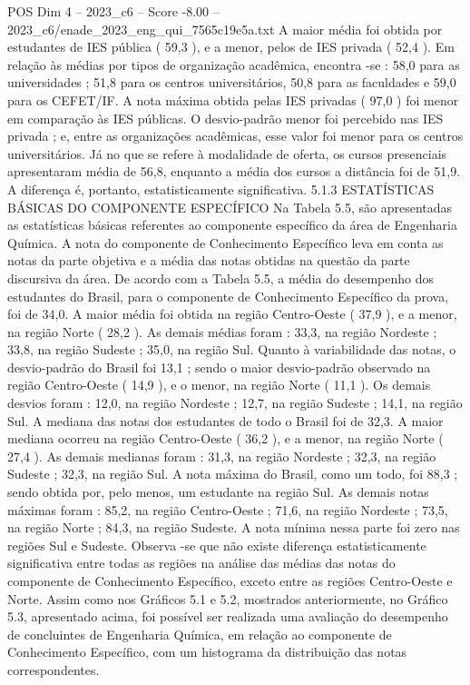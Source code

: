 \begin{textsample}{POS Dim 4 – 2023\_c6 – Score -8.00 – 2023\_c6/enade\_2023\_eng\_qui\_7565c19e5a.txt}
A maior média foi obtida por estudantes de IES pública ( 59,3 ), e a menor, pelos de IES privada ( 52,4 ).
Em relação às médias por tipos de organização acadêmica, encontra -se : 58,0 para as universidades ; 51,8 para os centros universitários, 50,8 para as faculdades e 59,0 para os CEFET/IF.
A nota máxima obtida pelas IES privadas ( 97,0 ) foi menor em comparação às IES públicas.
O desvio-padrão menor foi percebido nas IES privada ; e, entre as organizações acadêmicas, esse valor foi menor para os centros universitários.
Já no que se refere à modalidade de oferta, os cursos presenciais apresentaram média de 56,8, enquanto a média dos cursos a distância foi de 51,9.
A diferença é, portanto, estatisticamente significativa. 5.1.3 ESTATÍSTICAS BÁSICAS DO COMPONENTE ESPECÍFICO Na Tabela 5.5, são apresentadas as estatísticas básicas referentes ao componente específico da área de Engenharia Química.
A nota do componente de Conhecimento Específico leva em conta as notas da parte objetiva e a média das notas obtidas na questão da parte discursiva da área.
De acordo com a Tabela 5.5, a média do desempenho dos estudantes do Brasil, para o componente de Conhecimento Específico da prova, foi de 34,0.
A maior média foi obtida na região Centro-Oeste ( 37,9 ), e a menor, na região Norte ( 28,2 ).
As demais médias foram : 33,3, na região Nordeste ; 33,8, na região Sudeste ; 35,0, na região Sul.
Quanto à variabilidade das notas, o desvio-padrão do Brasil foi 13,1 ; sendo o maior desvio-padrão observado na região Centro-Oeste ( 14,9 ), e o menor, na região Norte ( 11,1 ).
Os demais desvios foram : 12,0, na região Nordeste ; 12,7, na região Sudeste ; 14,1, na região Sul.
A mediana das notas dos estudantes de todo o Brasil foi de 32,3.
A maior mediana ocorreu na região Centro-Oeste ( 36,2 ), e a menor, na região Norte ( 27,4 ).
As demais medianas foram : 31,3, na região Nordeste ; 32,3, na região Sudeste ; 32,3, na região Sul.
A nota máxima do Brasil, como um todo, foi 88,3 ; sendo obtida por, pelo menos, um estudante na região Sul.
As demais notas máximas foram : 85,2, na região Centro-Oeste ; 71,6, na região Nordeste ; 73,5, na região Norte ; 84,3, na região Sudeste.
A nota mínima nessa parte foi zero nas regiões Sul e Sudeste.
Observa -se que não existe diferença estatisticamente significativa entre todas as regiões na análise das médias das notas do componente de Conhecimento Específico, exceto entre as regiões Centro-Oeste e Norte.
Assim como nos Gráficos 5.1 e 5.2, mostrados anteriormente, no Gráfico 5.3, apresentado acima, foi possível ser realizada uma avaliação do desempenho de concluintes de Engenharia Química, em relação ao componente de Conhecimento Específico, com um histograma da distribuição das notas correspondentes.

\end{textsample}

